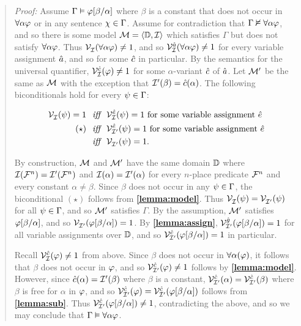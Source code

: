 \begin{quote} 
  \textit{Proof:} Assume $\Gamma \vDash \varphi[\beta/\alpha]$ where $\beta$ is a constant that does not occur in $\forall\alpha\varphi$ or in any sentence $\chi\in\Gamma$.
  Assume for contradiction that $\Gamma \nvDash \forall \alpha\varphi$, and so there is some model $\mathcal{M}=\langle\mathbb{D},\mathcal{I}\rangle$ which satisfies $\Gamma$ but does not satisfy $\forall \alpha\varphi$.
  Thus $\mathcal{V}_{\mathcal{I}}^{}(\forall \alpha\varphi)\neq 1$, and so $\mathcal{V}_{\mathcal{I}}^{\hat{a}}(\forall \alpha\varphi)\neq 1$ for every variable assignment $\hat{a}$, and so for some $\hat{c}$ in particular. 
  By the semantics for the universal quantifier, $\mathcal{V}_{\mathcal{I}}^{\hat{c}}(\varphi)\neq 1$ for some $\alpha$-variant $\hat{c}$ of $\hat{a}$.
  Let $\mathcal{M}'$ be the same as $\mathcal{M}$ with the exception that $\mathcal{I}'(\beta)=\hat{c}(\alpha)$.
  The following biconditionals hold for every $\psi \in \Gamma$:

  \vspace{-.2in}
  \begin{align*}
    \mathcal{V}_{\mathcal{I}}^{}(\psi)=1 &\textit{ ~iff~ } \mathcal{V}_{\mathcal{I}}^{\hat{e}}(\psi)=1 \text{ for some variable assignment } \hat{e}\\
     (\star) &\textit{ ~iff~ } \mathcal{V}_{\mathcal{I}'}^{\hat{e}}(\psi)=1 \text{ for some variable assignment } \hat{e}\\ 
     &\textit{ ~iff~ } \mathcal{V}_{\mathcal{I}'}^{}(\psi)=1.
  \end{align*}

  By construction, $\mathcal{M}$ and $\mathcal{M}'$ have the same domain $\mathbb{D}$ where $\mathcal{I}(\mathcal{F}^n)=\mathcal{I}'(\mathcal{F}^n)$ and $\mathcal{I}(\alpha)=\mathcal{I}'(\alpha)$ for every $n$-place predicate $\mathcal{F}^n$ and every constant $\alpha\neq\beta$.
  Since $\beta$ does not occur in any $\psi \in \Gamma$, the biconditional $(\star)$ follows from \textbf{\ref{lemma:model}}.
  Thus $\mathcal{V}_{\mathcal{I}}^{}(\psi)=\mathcal{V}_{\mathcal{I}'}^{}(\psi)$ for all $\psi\in\Gamma$, and so $\mathcal{M}'$ satisfies $\Gamma$.
  By the assumption, $\mathcal{M}'$ satisfies $\varphi[\beta/\alpha]$, and so $\mathcal{V}_{\mathcal{I}'}^{}(\varphi[\beta/\alpha])=1$.
  By \textbf{\ref{lemma:assign}}, $\mathcal{V}_{\mathcal{I}'}^{\hat{g}}(\varphi[\beta/\alpha])=1$ for all variable assignments over $\mathbb{D}$, and so $\mathcal{V}_{\mathcal{I}'}^{\hat{c}}(\varphi[\beta/\alpha])=1$ in particular.

  Recall $\mathcal{V}_{\mathcal{I}}^{\hat{c}}(\varphi)\neq 1$ from above.
  Since $\beta$ does not occur in $\forall \alpha(\varphi)$, it follows that $\beta$ does not occur in $\varphi$, and so $\mathcal{V}_{\mathcal{I}'}^{\hat{c}}(\varphi)\neq 1$ follows by \textbf{\ref{lemma:model}}.
  However, since $\hat{c}(\alpha)=\mathcal{I}'(\beta)$ where $\beta$ is a constant, $\mathcal{V}_{\mathcal{I}'}^{\hat{c}}(\alpha)=\mathcal{V}_{\mathcal{I}'}^{\hat{c}}(\beta)$ where $\beta$ is free for $\alpha$ in $\varphi$, and so $\mathcal{V}_{\mathcal{I}'}^{\hat{c}}(\varphi)=\mathcal{V}_{\mathcal{I}'}^{\hat{c}}(\varphi[\beta/\alpha])$ follows from \textbf{\ref{lemma:sub}}.
  Thus $\mathcal{V}_{\mathcal{I}'}^{\hat{c}}(\varphi[\beta/\alpha])\neq 1$, contradicting the above, and so we may conclude that $\Gamma \vDash \forall \alpha\varphi$.
\end{quote}

